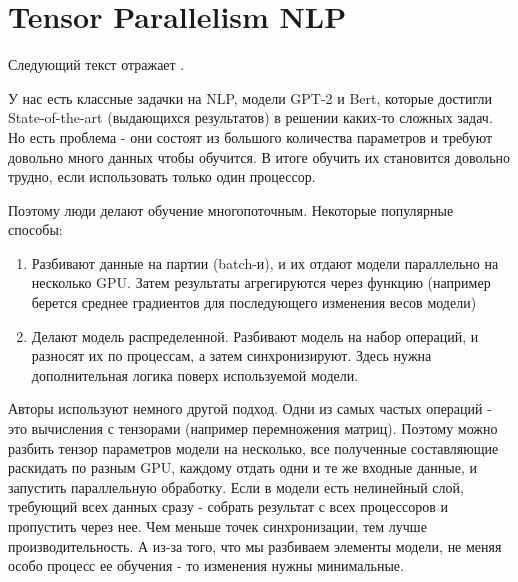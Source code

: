 
\section{Tensor Parallelism NLP}

Следующий текст отражает \cite{shoeybi2019megatron}.

У нас есть классные задачки на NLP, модели GPT-2 и Bert, которые достигли State-of-the-art (выдающихся результатов) в решении каких-то сложных задач. Но есть проблема - они состоят из большого количества параметров и требуют довольно много данных чтобы обучится. В итоге обучить их становится довольно трудно, если использовать только один процессор.

Поэтому люди делают обучение многопоточным. Некоторые популярные способы: 
\begin{enumerate}
    \item Разбивают данные на партии (batch-и), и их отдают модели параллельно на несколько GPU. Затем результаты агрегируются через функцию (например берется среднее градиентов для последующего изменения весов модели)
    \item  Делают модель распределенной. Разбивают модель на набор операций, и разносят их по процессам, а затем синхронизируют. Здесь нужна дополнительная логика поверх используемой модели. 
\end{enumerate}
Авторы используют немного другой подход. Одни из самых частых операций - это вычисления с тензорами (например перемножения матриц). Поэтому можно разбить тензор параметров модели на несколько, все полученные составляющие раскидать по разным GPU, каждому отдать одни и те же входные данные, и запустить параллельную обработку. Если в модели есть нелинейный слой, требующий всех данных сразу - собрать результат с всех процессоров и пропустить через нее. Чем меньше точек синхронизации, тем лучше производительность. А из-за того, что мы разбиваем элементы модели, не меняя особо процесс ее обучения - то изменения нужны минимальные.

